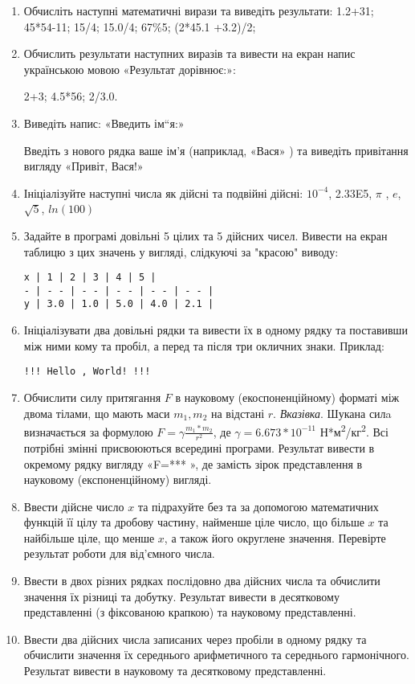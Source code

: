 \documentclass[]{article}
\begin{document}
\begin{enumerate}
\def\labelenumi{3.\arabic{enumi}.}
\item
Обчисліть наступні математичні вирази та виведіть результати:
1.2+31; 45*54-11; 15/4; 15.0/4; 67\%5; (2*45.1 +3.2)/2;


\item
Обчислить результати наступних виразів та вивести на екран напис
українською мовою «Результат дорівнює:»:

2+3; 4.5*56; 2/3.0.
\item
Виведіть напис: «Введить ім``я:»

Введіть з нового рядка ваше ім'я (наприклад, «Вася» ) та виведіть
привітання вигляду «Привіт, Вася!»

\item
Ініціалізуйте наступні числа як дійсні та подвійні дійсні:
\(10^{- 4}\), 2.33E5, \(\pi\) , \(e\), \( \sqrt{5}\), \(ln(100)\)
\item
Задайте в програмі довільні 5 цілих та 5 дійсних чисел. Вивести на екран таблицю
з цих значень у вигляді, слідкуючі за "красою" виводу:
\begin{verbatim}
x | 1 | 2 | 3 | 4 | 5 |
- | - - | - - | - - | - - | - - |
y | 3.0 | 1.0 | 5.0 | 4.0 | 2.1 |
\end{verbatim}

\item
Ініціалізувати два довільні рядки та вивести їх в одному рядку та
поставивши між ними кому та пробіл, а перед та після три окличних знаки.
Приклад:
\begin{verbatim}
!!! Hello , World! !!!
\end{verbatim}

\item
Обчислити силу притягання $F$ в науковому (екоспоненційному) форматі між двома тілами,
  що мають маси $m_{1},m_{2}$ на відстані $r$.
  \emph{\emph{Вказівка}}. Шукана силa визначається за формулою
  $ F=\gamma \frac{m_{1}*m_{2}}{r^{2}}$,
  де $\gamma = 6.673*10^{-11}$ Н*м\textsuperscript{2}/кг\textsuperscript{2}. Всі потрібні змінні
  присвоюються всередині програми. Результат вивести в окремому рядку
  вигляду «F=*** », де замість зірок представлення в науковому
  (експоненційному) вигляді.
\item
Ввести дійсне число $x$ та підрахуйте без та за допомогою математичних
функцій її цілу та дробову частину, найменше ціле число, що більше $x$
та найбільше ціле, що менше $x$, а також його округлене значення.
Перевірте результат роботи для від'ємного числа.
\item
Ввести в двох різних рядках послідовно два дійсних числа та обчислити
значення їх різниці та добутку. Результат вивести в десятковому 
представленні (з фіксованою крапкою) та науковому представленні.
\item
Ввести два дійсних числа записаних через пробіли в одному рядку та
обчислити значення їх середнього арифметичного та середнього
гармонічного. Результат вивести в науковому та десятковому
представленні.


\end{enumerate}
\end{document}
